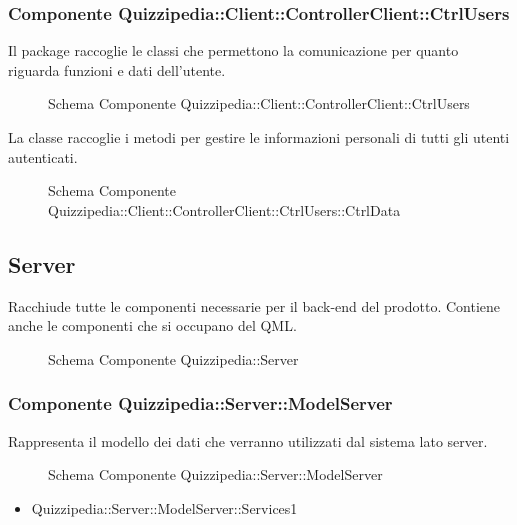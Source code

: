 \subsubsection{Componente Quizzipedia::Client::ControllerClient::CtrlUsers}
Il package raccoglie le classi che permettono la comunicazione per quanto riguarda funzioni e dati dell'utente.
\begin{figure}[H]
\centering
\noindent{}
\caption{Schema Componente Quizzipedia::Client::ControllerClient::CtrlUsers}
\end{figure}
La classe raccoglie i metodi per gestire le informazioni personali di tutti gli utenti autenticati.
\begin{figure}[H]
\centering
\noindent{}
\caption{Schema Componente Quizzipedia::Client::ControllerClient::CtrlUsers::CtrlData}
\end{figure}
\subsection{Server}
Racchiude tutte le componenti necessarie per il back-end del prodotto. Contiene anche le componenti che si occupano del QML.
\begin{figure}[H]
\centering
\noindent{}
\caption{Schema Componente Quizzipedia::Server}
\end{figure}
\subsubsection{Componente Quizzipedia::Server::ModelServer}
Rappresenta il modello dei dati che verranno utilizzati dal sistema lato server.
\begin{figure}[H]
\centering
\noindent{}
\caption{Schema Componente Quizzipedia::Server::ModelServer}
\end{figure}
\begin{itemize}
\item Quizzipedia::Server::ModelServer::Services1
\end{itemize}
